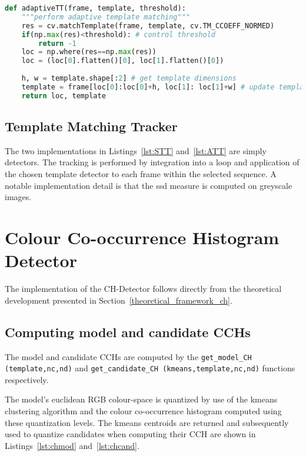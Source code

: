 \begin{lstlisting}[language=Python, caption={ATT tracking loop}, captionpos=b, label={lst:ATT}]
def adaptiveTT(frame, template, threshold):
    """perform adaptive template matching"""
    res = cv.matchTemplate(frame, template, cv.TM_CCOEFF_NORMED)
    if(np.max(res)<threshold): # control threshold
        return -1
    loc = np.where(res==np.max(res))
    loc = (loc[0].flatten()[0], loc[1].flatten()[0])        
    
    h, w = template.shape[:2] # get template dimensions
    template = frame[loc[0]:loc[0]+h, loc[1]: loc[1]+w] # update template
    return loc, template
\end{lstlisting}

\subsection{Template Matching Tracker}
The two implementations in Listings~\ref{lst:STT} and~\ref{lst:ATT} are simply
detectors. The tracking is performed by integration into a loop and application
of the chosen template detector to each frame within the selected sequence.
A notable implementation detail is that the ssd measure is computed on greyscale
images.

\section{Colour Co-occurrence Histogram Detector}\label{implementation_ch}
The implementation of the CH-Detector follows directly from the theoretical
development presented in Section~\ref{theoretical_framework_ch}.

\subsection{Computing model and candidate CCHs}
The model and candidate CCHs are computed by the \lstinline{get_model_CH (template,nc,nd)} 
and \lstinline{get_candidate_CH (kmeans,template,nc,nd)}
functions respectively.

The model's euclidean RGB colour-space is quantized by use of the kmeans
clustering algorithm and the colour co-occurrence histogram computed using these
quantization levels. The kmeans centroids are returned and subsequently used to
quantize candidates when computing their CCH are shown in
Listings~\ref{lst:chmod} and~\ref{lst:chcand}.

